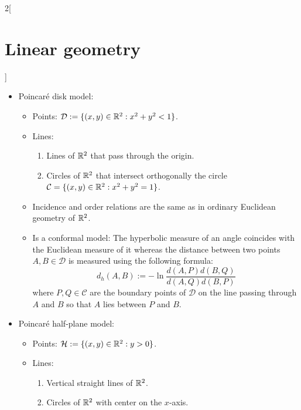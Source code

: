 \documentclass[../../../main_math.tex]{subfiles}
\begin{document}
\begin{multicols}{2}[\section{Linear geometry}]
\begin{definition}
\begin{itemize}
\begin{center}
            \end{center}
      \item Poincaré disk model:
            \begin{itemize}
              \item Points: $\mathcal{D}:=\{(x,y)\in\mathbb{R}^2:x^2+y^2<1\}$.
              \item Lines:
                    \begin{enumerate}
                      \item Lines of $\mathbb{R}^2$ that pass through the origin.
                      \item Circles of $\mathbb{R}^2$ that intersect orthogonally the circle $\mathcal{C}=\{(x,y)\in\mathbb{R}^2:x^2+y^2=1\}$.
                    \end{enumerate}
              \item Incidence and order relations are the same as in ordinary Euclidean geometry of $\mathbb{R}^2$.
              \item Is a conformal model: The hyperbolic measure of an angle coincides with the Euclidean measure of it whereas the distance between two points $A,B\in\mathcal{D}$ is measured using the following formula: $$d_h(A,B):=-\ln\frac{d(A,P)d(B,Q)}{d(A,Q)d(B,P)}$$ where $P,Q\in\mathcal{C}$ are the boundary points of $\mathcal{D}$ on the line passing through $A$ and $B$ so that $A$ lies between $P$ and $B$.
            \end{itemize}
            \begin{center}
              \begin{minipage}{\linewidth}
                \centering
                
              \end{minipage}
            \end{center}
      \item Poincaré half-plane model:
            \begin{itemize}
              \item Points: $\mathcal{H}:=\{(x,y)\in\mathbb{R}^2:y>0\}$.
              \item Lines:
                    \begin{enumerate}
                      \item Vertical straight lines of $\mathbb{R}^2$.
                      \item Circles of $\mathbb{R}^2$ with center on the $x$-axis.
                    \end{enumerate}

\end{itemize}
\end{itemize}
\end{definition}
\end{multicols}
\end{document}
